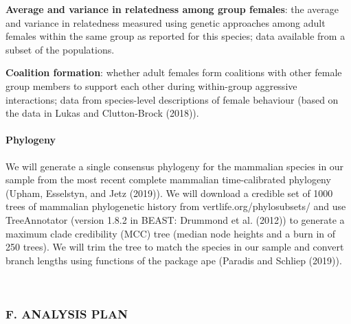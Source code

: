\documentclass[]{article}
\let\oldparagraph\paragraph
\renewcommand{\paragraph}[1]{\oldparagraph{#1}\mbox{}}
\begin{document}
\textbf{Average and variance in relatedness among group females}: the
average and variance in relatedness measured using genetic approaches
among adult females within the same group as reported for this species;
data available from a subset of the populations.

\textbf{Coalition formation}: whether adult females form coalitions with
other female group members to support each other during within-group
aggressive interactions; data from species-level descriptions of female
behaviour (based on the data in Lukas and Clutton-Brock (2018)).

\hypertarget{phylogeny}{%
\paragraph{\texorpdfstring{\textbf{Phylogeny}}{Phylogeny}}\label{phylogeny}}

We will generate a single consensus phylogeny for the mammalian species
in our sample from the most recent complete mammalian time-calibrated
phylogeny (Upham, Esselstyn, and Jetz (2019)). We will download a
credible set of 1000 trees of mammalian phylogenetic history from
vertlife.org/phylosubsets/ and use TreeAnnotator (version 1.8.2 in
BEAST: Drummond et al. (2012)) to generate a maximum clade credibility
(MCC) tree (median node heights and a burn in of 250 trees). We will
trim the tree to match the species in our sample and convert branch
lengths using functions of the package ape (Paradis and Schliep (2019)).

~

\hypertarget{f.-analysis-plan}{%
\subsubsection{F. ANALYSIS PLAN}\label{f.-analysis-plan}}
\end{document}
